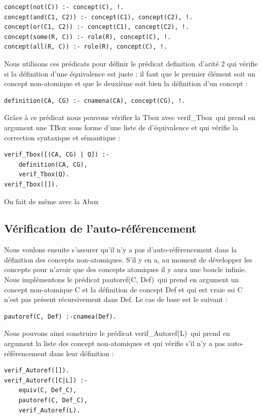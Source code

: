 \documentclass[12pt]{article}
\begin{document}
\begin{verbatim}
concept(not(C)) :- concept(C), !.
concept(and(C1, C2)) :- concept(C1), concept(C2), !.
concept(or(C1, C2)) :- concept(C1), concept(C2), !.
concept(some(R, C)) :- role(R), concept(C), !.
concept(all(R, C)) :- role(R), concept(C), !.
\end{verbatim}

Nous utilisons ces prédicats pour définir le prédicat \color{blue}definition\color{black}\ d'arité 2 qui vérifie si la définition d'une équivalence est juste : il faut que le premier élément soit un concept non-atomique et que le deuxième soit bien la définition d'un concept :
\begin{verbatim}
definition(CA, CG) :- cnamena(CA), concept(CG), !.
\end{verbatim}

Grâce à ce prédicat nous pouvons vérifier la Tbox avec \color{blue}verif\_Tbox\color{black}\ qui prend en argument une TBox sous forme d'une liste de d'équivalence et qui vérifie la correction syntaxique et sémantique : 
\begin{verbatim}
verif_Tbox([(CA, CG) | Q]) :- 
    definition(CA, CG), 
    verif_Tbox(Q).
verif_Tbox([]).
\end{verbatim}
On fait de même avec la Abox
\subsection{Vérification de l'auto-référencement}
Nous voulons ensuite s'assurer qu'il n'y a pas d'auto-référencement dans la définition des concepts non-atomiques. S'il y en a, au moment de développer les concepts pour n'avoir que des concepts atomiques il y aura une boucle infinie. Nous implémentons le prédicat \color{blue}pautoref(C, Def)\color{black}\ qui prend en argument un concept non-atomique C et la définition de concept Def et qui est vraie ssi C n'est pas présent récursivement dans Def. Le cas de base est le suivant :
\begin{verbatim}
pautoref(C, Def) :-cnamea(Def).
\end{verbatim}

Nous pouvons ainsi construire le prédicat \color{blue}verif\_Autoref(L)\color{black}\ qui prend en argument la liste des concept non-atomiques et qui vérifie s'il n'y a pas auto-référencement dans leur définition : 
\begin{verbatim}
verif_Autoref([]).
verif_Autoref([C|L]) :-
	equiv(C, Def_C),
	pautoref(C, Def_C),
	verif_Autoref(L).
\end{verbatim}
\end{document}
